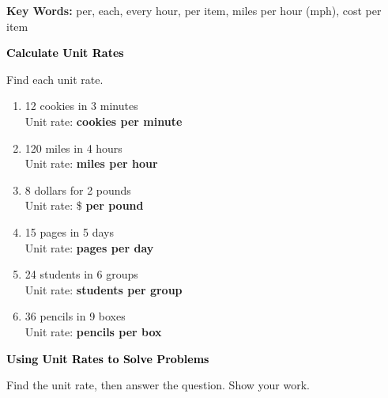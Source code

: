 \documentclass[12pt, letterpaper, fleqn]{article}
\newcommand{\blankshorter}{\underline{\hspace{1.5cm}}}
\begin{document}
\medskip
\noindent
\textbf{Key Words:} per, each, every hour, per item, miles per hour (mph), cost per item

\newpage

\begin{tcolorbox}[colback=customteal!20]
\large\textcolor{black}{\textbf{Calculate Unit Rates}}
\end{tcolorbox}

\noindent
Find each unit rate.

\begin{enumerate}[itemsep=1.3cm, leftmargin=0.6cm]
\item 12 cookies in 3 minutes\\
Unit rate: \blankshorter \; \textbf{cookies per minute}

\item 120 miles in 4 hours\\
Unit rate: \blankshorter \; \textbf{miles per hour}

\item 8 dollars for 2 pounds\\
Unit rate: \$ \blankshorter \; \textbf{per pound}

\item 15 pages in 5 days\\
Unit rate: \blankshorter \; \textbf{pages per day}

\item 24 students in 6 groups\\
Unit rate: \blankshorter \; \textbf{students per group}

\item 36 pencils in 9 boxes\\
Unit rate: \blankshorter \; \textbf{pencils per box}
\end{enumerate}

\newpage

\begin{tcolorbox}[colback=customteal!20]
\large\textcolor{black}{\textbf{Using Unit Rates to Solve Problems}}
\end{tcolorbox}

\noindent
Find the unit rate, then answer the question. Show your work.
\end{document}
